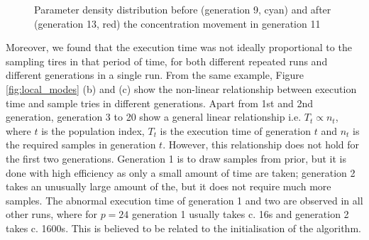 \begin{figure}[h]
    \begin{center}
    \end{center}

    \caption[Parameter density distribution before and after the concentration movement in generation 11]{Parameter density distribution before (generation 9, cyan) and after (generation 13, red) the concentration movement in generation 11}
    \label{fig:local_para}
\end{figure}

Moreover, we found that the execution time was not ideally proportional to the sampling tires in that period of time, for both different repeated runs and different generations in a single run. From the same example, Figure \ref{fig:local_modes} (b) and (c) show the non-linear relationship between execution time and sample tries in different generations. Apart from 1st and 2nd generation, generation 3 to 20 show a general linear relationship i.e. $T_t\propto n_t$, where $t$ is the population index, $T_t$ is the execution time of generation $t$ and $n_t$ is the required samples in generation $t$. However, this relationship does not hold for the first two generations. Generation 1 is to draw samples from prior, but it is done with high efficiency as only a small amount of time are taken; generation 2 takes an unusually large amount of the, but it does not require much more samples. The abnormal execution time of generation 1 and two are observed in all other runs, where for $p=24$ generation 1 usually takes c. 16s and generation 2 takes c. 1600s. This is believed to be related to the initialisation of the algorithm. 

